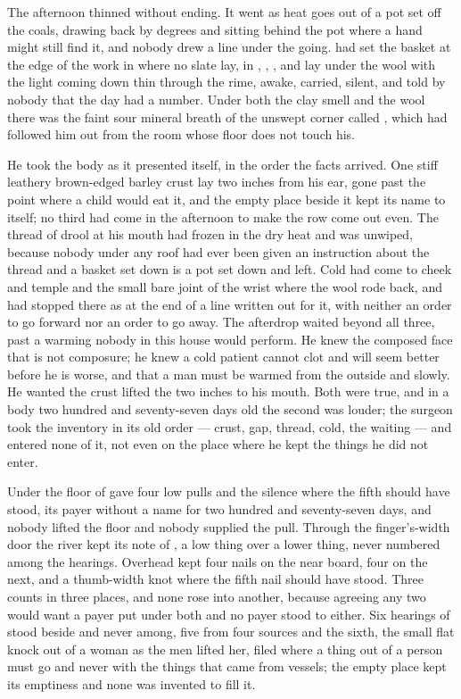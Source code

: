 The afternoon thinned without ending. It went as heat goes out of a pot set off the coals, drawing back by degrees and sitting behind the pot where a hand might still find it, and nobody drew a line under the going.  had set the basket at the edge of the work in  where no slate lay, in , , , and  lay under the wool with the light coming down thin through the rime, awake, carried, silent, and told by nobody that the day had a number. Under both the clay smell and the wool there was the faint sour mineral breath of the unswept corner called , which had followed him out from the room whose floor does not touch his.

He took the body as it presented itself, in the order the facts arrived. One stiff leathery brown-edged barley crust lay two inches from his ear, gone past the point where a child would eat it, and the empty place beside it kept its name to itself; no third had come in the afternoon to make the row come out even. The thread of drool at his mouth had frozen in the dry heat and was unwiped, because nobody under any roof had ever been given an instruction about the thread and a basket set down is a pot set down and left. Cold had come to cheek and temple and the small bare joint of the wrist where the wool rode back, and had stopped there as at the end of a line written out for it, with neither an order to go forward nor an order to go away. The afterdrop waited beyond all three, past a warming nobody in this house would perform. He knew the composed face that is not composure; he knew a cold patient cannot clot and will seem better before he is worse, and that a man must be warmed from the outside and slowly. He wanted the crust lifted the two inches to his mouth. Both were true, and in a body two hundred and seventy-seven days old the second was louder; the surgeon took the inventory in its old order --- crust, gap, thread, cold, the waiting --- and entered none of it, not even on the place where he kept the things he did not enter.

Under the floor of   gave four low pulls and the silence where the fifth should have stood, its payer without a name for two hundred and seventy-seven days, and nobody lifted the floor and nobody supplied the pull. Through the finger's-width door the river kept its note of , a low thing over a lower thing, never numbered among the hearings. Overhead  kept four nails on the near board, four on the next, and a thumb-width knot where the fifth nail should have stood. Three counts in three places, and none rose into another, because agreeing any two would want a payer put under both and no payer stood to either. Six hearings of  stood beside and never among, five from four sources and the sixth, the small flat knock out of a woman as the men lifted her, filed where a thing out of a person must go and never with the things that came from vessels; the empty place kept its emptiness and none was invented to fill it.

